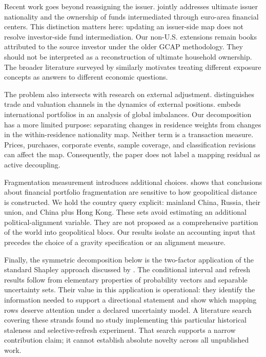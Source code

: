 \documentclass[11pt,a4paper]{article}
\begin{document}
Recent work goes beyond reassigning the issuer. \citet{beck} jointly addresses ultimate issuer nationality and the ownership of funds intermediated through euro-area financial centers. This distinction matters here: updating an issuer-side map does not resolve investor-side fund intermediation. Our non-U.S. extensions remain books attributed to the source investor under the older GCAP methodology. They should not be interpreted as a reconstruction of ultimate household ownership. The broader literature surveyed by \citet{review} similarly motivates treating different exposure concepts as answers to different economic questions.

The problem also intersects with research on external adjustment. \citet{gr} distinguishes trade and valuation channels in the dynamics of external positions. \citet{portfolio} embeds international portfolios in an analysis of global imbalances. Our decomposition has a more limited purpose: separating changes in residence weights from changes in the within-residence nationality map. Neither term is a transaction measure. Prices, purchases, corporate events, sample coverage, and classification revisions can affect the map. Consequently, the paper does not label a mapping residual as active decoupling.

Fragmentation measurement introduces additional choices. \citet{airaudo} shows that conclusions about financial portfolio fragmentation are sensitive to how geopolitical distance is constructed. We hold the country query explicit: mainland China, Russia, their union, and China plus Hong Kong. These sets avoid estimating an additional political-alignment variable. They are not proposed as a comprehensive partition of the world into geopolitical blocs. Our results isolate an accounting input that precedes the choice of a gravity specification or an alignment measure.

Finally, the symmetric decomposition below is the two-factor application of the standard Shapley approach discussed by \citet{shorrocks}. The conditional interval and refresh results follow from elementary properties of probability vectors and separable uncertainty sets. Their value in this application is operational: they identify the information needed to support a directional statement and show which mapping rows deserve attention under a declared uncertainty model. A literature search covering these strands found no study implementing this particular historical staleness and selective-refresh experiment. That search supports a narrow contribution claim; it cannot establish absolute novelty across all unpublished work.
\end{document}

